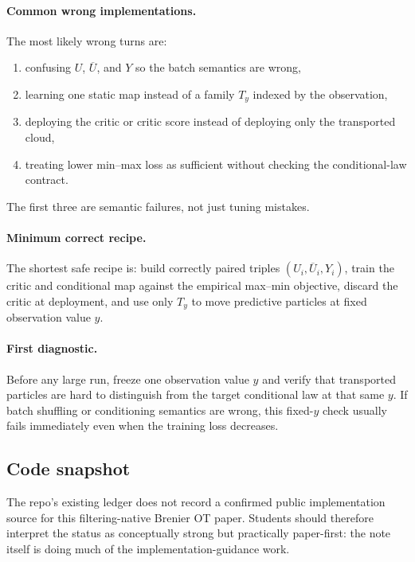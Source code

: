 \documentclass[11pt]{report}
\begin{document}
\paragraph{Common wrong implementations.}
The most likely wrong turns are:
\begin{enumerate}[label=(\roman*)]
  \item confusing $U$, $\overline U$, and $Y$ so the batch semantics are wrong,
  \item learning one static map instead of a family $T_y$ indexed by the observation,
  \item deploying the critic or critic score instead of deploying only the transported cloud,
  \item treating lower min--max loss as sufficient without checking the conditional-law contract.
\end{enumerate}
The first three are semantic failures, not just tuning mistakes.

\paragraph{Minimum correct recipe.}
The shortest safe recipe is: build correctly paired triples $(U_i,\overline U_i,Y_i)$,
train the critic and conditional map against the empirical max--min objective, discard
the critic at deployment, and use only $T_y$ to move predictive particles at fixed
observation value $y$.

\paragraph{First diagnostic.}
Before any large run, freeze one observation value $y$ and verify that transported
particles are hard to distinguish from the target conditional law at that same $y$.
If batch shuffling or conditioning semantics are wrong, this fixed-$y$ check usually
fails immediately even when the training loss decreases.

\subsection*{Code snapshot}

The repo's existing ledger does not record a confirmed public implementation source
for this filtering-native Brenier OT paper.  Students should therefore interpret the
status as conceptually strong but practically paper-first: the note itself is doing
much of the implementation-guidance work.
\end{document}
